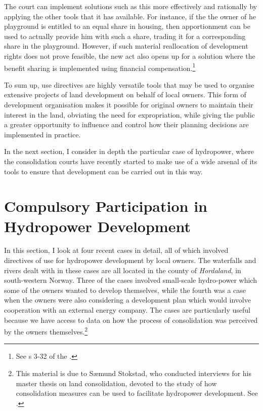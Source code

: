 {The court can implement solutions such as this more effectively and rationally by applying the other tools that it has available. For instance, if the the owner of he playground is entitled to an equal share in housing, then apportionment can be used to actually provide him with such a share, trading it for a corresponding share in the playground. However, if such material reallocation of development rights does not prove feasible, the new act also opens up for a solution where the benefit sharing is implemented using financial compensation.\footnote{See s 3-32 of the \cite{lca13}.}
}

To sum up, use directives are highly versatile tools that may be used to organise extensive projects of land development on behalf of local owners. This form of development organisation makes it possible for original owners to maintain their interest in the land, obviating the need for expropriation, while giving the public a greater opportunity to influence and control  how their planning decisions are implemented in practice. 

In the next section, I consider in depth the particular case of hydropower, where the consolidation courts have recently started to make use of a wide arsenal of its tools to ensure that development can be carried out in this way.

\section{Compulsory Participation in Hydropower Development}\label{sec:lch}

In this section, I look at four recent cases in detail, all of which involved directives of use for hydropower development by local owners. The waterfalls and rivers dealt with in these cases are all located in the county of \emph{Hordaland}, in south-western Norway. Three of the cases involved small-scale hydro-power which some of the owners wanted to develop themselves, while the fourth was a case when the owners were also considering a development plan which would involve cooperation with an external energy company. The cases are particularly useful because we have access to data on how the process of consolidation was perceived by the owners themselves.\footnote{This material is due to Sæmund Stokstad, who conducted interviews for his master thesis on land consolidation, devoted to the study of how consolidation measures can be used to facilitate hydropower development. See \cite{stokstad11}.}


